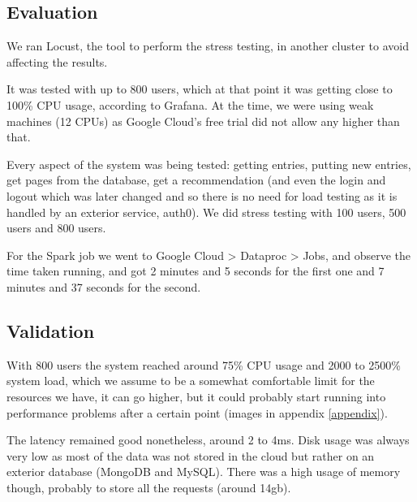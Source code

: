 \documentclass[oneside]{article}
\newcommand*\fpar{\hspace{1ex}}
\begin{document}
  \subsection{Evaluation}
  \label{sec:evaluation}
  \fpar We ran Locust, the tool to perform the stress testing, in another cluster to avoid affecting the results. 
  \par It was tested with up to 800 users, which at that point it was getting close to 100\% CPU usage, according to Grafana. At the time, we were using weak machines (12 CPUs) as Google Cloud's free trial did not allow any higher than that. 
  \par Every aspect of the system was being tested: getting entries, putting new entries, get pages from the database, get a recommendation (and even the login and logout which was later changed and so there is no need for load testing as it is handled by an exterior service, auth0). We did stress testing with 100 users, 500 users and 800 users.
  \par For the Spark job we went to Google Cloud > Dataproc > Jobs, and observe the time taken running, and got 2 minutes and 5 seconds for the first one and 7 minutes and 37 seconds for the second.

  \subsection{Validation}
  \label{sec:validation}
  \fpar With 800 users the system reached around 75\% CPU usage and 2000 to 2500\% system load, which we assume to be a somewhat comfortable limit for the resources we have, it can go higher, but it could probably start running into performance problems after a certain point (images in appendix \ref{appendix}).
  \par The latency remained good nonetheless, around 2 to 4ms. Disk usage was always very low as most of the data was not stored in the cloud but rather on an exterior database (MongoDB and MySQL). There was a high usage of memory though, probably to store all the requests (around 14gb).
\end{document}
